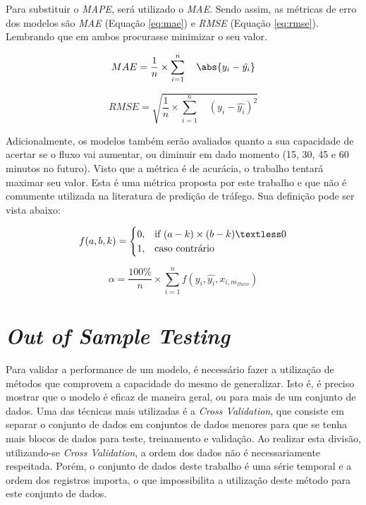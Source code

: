 Para substituir o \textit{\acrshort{MAPE}}, será utilizado o \textit{\acrshort{MAE}}. Sendo assim, as métricas de erro dos modelos são \textit{\acrshort{MAE}} (Equação \ref{eq:mae}) e \textit{\acrshort{RMSE}} (Equação \ref{eq:rmse}). Lembrando que em ambos procurasse minimizar o seu valor.

\begin{equation}
\label{eq:mae}
MAE = \frac{1}{n} \times \sum_{i=1}^{n} \quad \abs{y_i - \hat{y_i}}
\end{equation}

\begin{equation}
\label{eq:rmse}
RMSE = \sqrt{ \frac{1}{n} \times \sum_{i=1}^{n} \quad (y_i - \hat{y_i}) ^ 2}
\end{equation}

Adicionalmente, os modelos também serão avaliados quanto a sua capacidade de acertar se o fluxo vai aumentar, ou diminuir em dado momento (15, 30, 45 e 60 minutos no futuro). Visto que a métrica é de acurácia, o trabalho tentará maximar seu valor. Esta é uma métrica proposta por este trabalho e que não é comumente utilizada na literatura de predição de tráfego. Sua definição pode ser vista abaixo:

\begin{equation}
f(a, b, k) =
\begin{cases}
  0, & \text{if}\ (a - k) \times (b - k) \textless 0 \\
  1, & \text{caso contrário}
\end{cases}
\end{equation}

\begin{equation}
\alpha = \frac{100\%}{n} \times \sum_{i=1}^{n} f(y_i, \hat{y_i}, x_{i, m_{fluxo}})
\end{equation}

\section{\textit{Out of Sample Testing}}

Para validar a performance de um modelo, é necessário fazer a utilização de métodos que comprovem a capacidade do mesmo de generalizar. Isto é, é preciso mostrar que o modelo é eficaz de maneira geral, ou para mais de um conjunto de dados. Uma das técnicas mais utilizadas é a \textit{Cross Validation}, que consiste em separar o conjunto de dados em conjuntos de dados menores para que se tenha mais blocos de dados para teste, treinamento e validação. Ao realizar esta divisão, utilizando-se \textit{Cross Validation}, a ordem dos dados não é necessariamente respeitada. Porém, o conjunto de dados deste trabalho é uma série temporal e a ordem dos registros importa, o que impossibilita a utilização deste método para este conjunto de dados. 

